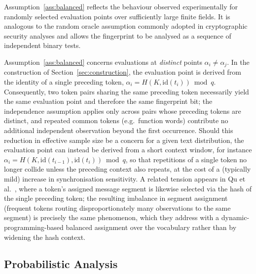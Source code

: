 \documentclass[a4paper,11pt]{llncs}
\begin{document}
\vspace{3mm}
Assumption~\ref{ass:balanced} reflects the behaviour observed
experimentally for randomly selected evaluation points over sufficiently
large finite fields. It is analogous to the random oracle assumption
commonly adopted in cryptographic security analyses and allows the
fingerprint to be analysed as a sequence of independent binary tests.

\begin{remark}
Assumption~\ref{ass:balanced} concerns evaluations at \emph{distinct} points
$\alpha_i\ne\alpha_j$. In the construction of Section~\ref{sec:construction}, the
evaluation point is derived from the identity of a single preceding token,
$\alpha_i = H(K,\mathrm{id}(t_i))\bmod q$. Consequently, two token pairs sharing the
same preceding token necessarily yield the same evaluation point and therefore the
same fingerprint bit; the independence assumption applies only across pairs whose
preceding tokens are distinct, and repeated common tokens (e.g.\ function words)
contribute no additional independent observation beyond the first occurrence. Should
this reduction in effective sample size be a concern for a given text distribution,
the evaluation point can instead be derived from a short context window, for
instance $\alpha_i = H(K,\mathrm{id}(t_{i-1}),\mathrm{id}(t_i))\bmod q$, so that
repetitions of a single token no longer collide unless the preceding context also
repeats, at the cost of a (typically mild) increase in synchronisation sensitivity.
A related tension appears in Qu et al.~\cite{qu2024provably}, where a token's
assigned message segment is likewise selected via the hash of the single preceding
token; the resulting imbalance in segment assignment (frequent tokens routing
disproportionately many observations to the same segment) is precisely the same
phenomenon, which they address with a dynamic-programming-based balanced assignment
over the vocabulary rather than by widening the hash context.
\end{remark}



\subsection{Probabilistic Analysis}
\end{document}
